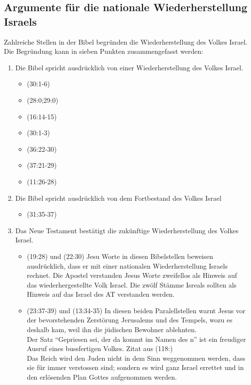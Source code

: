 \documentclass{../../inc/mybib}
\begin{document}
\subsection{Argumente für die nationale Wiederherstellung Israels}
Zahlreiche Stellen in der Bibel begründen die Wiederherstellung des Volkes Israel. Die Begründung kann in sieben Punkten zusammengefasst werden:
\begin{enumerate}
    \item Die Bibel spricht ausdrücklich von einer Wiederherstellung des Volkes Israel.\\ 
    \begin{itemize}
        \item {}(30:1-6)
        \item {}(28:0;29:0)
        \item {}(16:14-15)
        \item {}(30:1-3)
        \item {}(36:22-30)
        \item {}(37:21-29)
        \item {}(11:26-28)
    \end{itemize}    
    \item Die Bibel spricht ausdrücklich von dem Fortbestand des Volkes Israel\\
    \begin{itemize}
        \item {}(31:35-37)
    \end{itemize}
    \item Das Neue Testament bestätigt die zukünftige Wiederherstellung des Volkes Israel.\\
    \begin{itemize}
        \item {}(19:28) und (22:30) Jesu Worte in diesen Bibelstellen beweisen ausdrücklich, dass er mit einer nationalen Wiederherstellung Israels rechnet. Die Apostel verstanden Jesus Worte zweifellos als Hinweis auf das wiederhergestellte Volk Israel. Die zwölf Stämme Isreals sollten als Hinweis auf das Israel des AT verstanden werden.
        \item {}(23:37-39) und (13:34-35) In diesen beiden Paralellstellen warnt Jesus vor der bevorstehenden Zerstörung Jerusalems und des Tempels, wozu es deshalb kam, weil ihn die jüdischen Bewohner ablehnten.\\ Der Satz \enquote{Gepriesen sei, der da kommt im Namen des \herr n} ist ein freudiger Ausruf eines bussfertigen Volkes. Zitat aus (118:)\\ Das Reich wird den Juden nicht in dem Sinn weggenommen werden, dass sie für immer verstossen sind; sondern es wird \flq ganz Israel\frq{} errettet und in den erlösenden Plan Gottes aufgenommen werden.

\end{itemize}
\end{enumerate}
\end{document}
